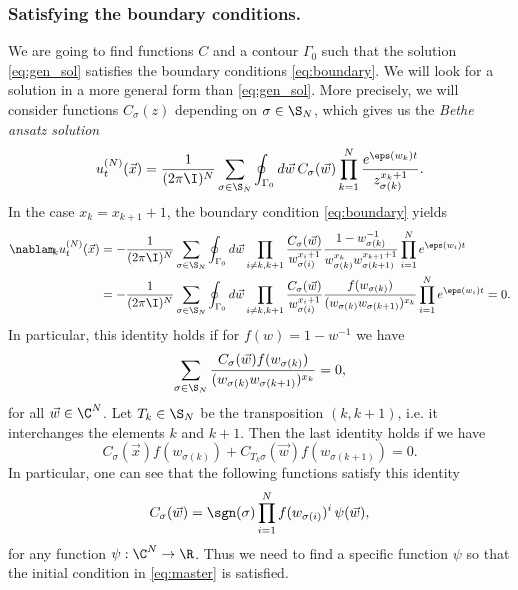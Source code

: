 \documentclass[]{pcmi}
\theoremstyle{plain}
\theoremstyle{definition}
\begin{document}
\subsubsection*{Satisfying the boundary conditions.}

We are going to find functions $C$ and a contour $\Gamma_0$ such that the solution \eqref{eq:gen_sol} satisfies the boundary conditions \eqref{eq:boundary}. We will look for a solution in a more general form than \eqref{eq:gen_sol}. More precisely, we will consider functions $C_\sigma(z)$ depending on $\sigma \in \S_N$, which gives us the \emph{Bethe ansatz solution}
\begin{equation}\label{eq:Bethe_u}
 	u^{(N)}_t(\vec x) = \frac{1}{(2\pi \I)^N} \sum_{\sigma \in \S_N} \oint_{\Gamma_0} d\vec w\, C_\sigma(\vec w) \prod_{k=1}^N \frac{e^{\eps(w_k) t}}{z_{\sigma(k)}^{x_k +1}}.
\end{equation}
In the case $x_{k} = x_{k+1} + 1$, the boundary condition \eqref{eq:boundary} yields
\begin{align*}
 	 \nablam_{\!k} u^{(N)}_t (\vec x) &=- \frac{1}{(2\pi \I)^N} \sum_{\sigma \in \S_N} \oint_{\Gamma_0} d \vec w \prod_{i \neq k, k+1} \frac{C_\sigma(\vec w)}{w_{\sigma(i)}^{x_i+1}} \frac{1 - w_{\sigma(k)}^{-1}}{w_{\sigma(k)}^{x_k} w_{\sigma(k+1)}^{x_{k+1}+1}} \prod_{i = 1}^N e^{\eps(w_i) t}\\
	 &= -\frac{1}{(2\pi \I)^N} \sum_{\sigma \in \S_N} \oint_{\Gamma_0} d \vec w \prod_{i \neq k, k+1} \frac{C_\sigma(\vec w)}{w_{\sigma(i)}^{x_i+1}} \frac{f(w_{\sigma(k)})}{(w_{\sigma(k)} w_{\sigma(k+1)})^{x_k}} \prod_{i = 1}^N e^{\eps(w_i) t} = 0.
\end{align*}
In particular, this identity holds if for $f(w) = 1 - w^{-1}$ we have
\[
 	\sum_{\sigma \in \S_N} \frac{C_\sigma(\vec w) f(w_{\sigma(k)})}{(w_{\sigma(k)} w_{\sigma(k+1)})^{x_k}} = 0,
\]
for all $\vec w \in \C^N$. Let $T_k \in \S_N$ be the transposition $(k, k+1)$, i.e. it interchanges the elements $k$ and $k+1$. Then the last identity holds if we have
\[
	C_\sigma(\vec x) f(w_{\sigma(k)}) + C_{T_k \sigma}(\vec w) f(w_{\sigma(k + 1)}) = 0.
\]
In particular, one can see that the following functions satisfy this identity
\begin{equation}\label{eq:C_sigma}
 	C_\sigma(\vec w) = \sgn(\sigma) \prod_{i=1}^N f(w_{\sigma(i)})^i\, \psi(\vec w),
\end{equation}
for any function $\psi : \C^N \to \R$. Thus we need to find a specific function $\psi$ so that the initial condition in \eqref{eq:master} is satisfied.
\end{document}

